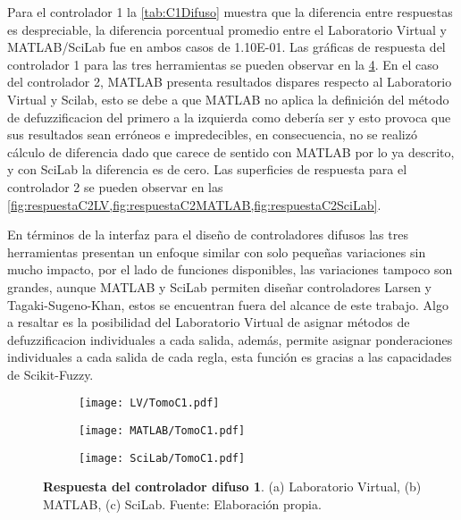         Para el controlador 1 la \cref{tab:C1Difuso} muestra que la diferencia entre respuestas es despreciable, la diferencia porcentual promedio entre el Laboratorio Virtual y MATLAB/SciLab fue en ambos casos de \num{1.10E-01}. Las gráficas de respuesta del controlador 1 para las tres herramientas se pueden observar en la \cref{fig:respuestaC1}. En el caso del controlador 2, MATLAB presenta resultados dispares respecto al Laboratorio Virtual y Scilab, esto se debe a que MATLAB no aplica la definición del método de defuzzificacion del primero a la izquierda como debería ser y esto provoca que sus resultados sean erróneos e impredecibles, en consecuencia, no se realizó cálculo de diferencia dado que carece de sentido con MATLAB por lo ya descrito, y con SciLab la diferencia es de cero. Las superficies de respuesta para el controlador 2 se pueden observar en las \cref{fig:respuestaC2LV,fig:respuestaC2MATLAB,fig:respuestaC2SciLab}.

        En términos de la interfaz para el diseño de controladores difusos las tres herramientas presentan un enfoque similar con solo pequeñas variaciones sin mucho impacto, por el lado de funciones disponibles, las variaciones tampoco son grandes, aunque MATLAB y SciLab permiten diseñar controladores Larsen y Tagaki-Sugeno-Khan, estos se encuentran fuera del alcance de este trabajo. Algo a resaltar es la posibilidad del Laboratorio Virtual de asignar métodos de defuzzificacion individuales a cada salida, además, permite asignar ponderaciones individuales a cada salida de cada regla, esta función es gracias a las capacidades de Scikit-Fuzzy.

        \begin{figure}[htb]
            \centering
            \begin{subfigure}[t]{0.32\textwidth}
                \centering
                \texttt{[image: LV/TomoC1.pdf]}
                \caption{}
                \label{fig:respuestaC11}
            \end{subfigure}
            \hfill
            \begin{subfigure}[t]{0.32\textwidth}
                \centering
                \texttt{[image: MATLAB/TomoC1.pdf]}
                \caption{}
                \label{fig:respuestaC12}
            \end{subfigure}
            \hfill
            \begin{subfigure}[t]{0.32\textwidth}
                \centering
                \texttt{[image: SciLab/TomoC1.pdf]}
                \caption{}
                \label{fig:respuestaC13}
            \end{subfigure}
            
            \caption[Comparación - Respuesta del controlador difuso 1]{\textbf{Respuesta del controlador difuso 1}. (a) Laboratorio Virtual, (b) MATLAB, (c) SciLab. Fuente: Elaboración propia. \label{fig:respuestaC1}}
        \end{figure}

